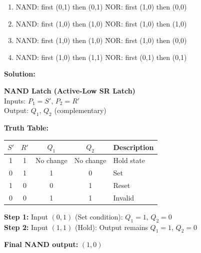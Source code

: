 \documentclass{article}
\begin{document}
\begin{enumerate}[label=(\Alph*)]
    \item \begin{tabbing}
        NAND: first (0,1) then (0,1) \quad \= NOR: first (1,0) then (0,0)
    \end{tabbing}
    
    \item \begin{tabbing}
        NAND: first (1,0) then (1,0) \quad \= NOR: first (1,0) then (1,0)
    \end{tabbing}
    
    \item \begin{tabbing}
        NAND: first (1,0) then (1,0) \quad \= NOR: first (1,0) then (0,0)
    \end{tabbing}
    
    \item \begin{tabbing}
        NAND: first (1,0) then (1,1) \quad \= NOR: first (0,1) then (0,1)
    \end{tabbing}
\end{enumerate}

\vspace{1em}

\noindent\textbf{Solution:}

\textbf{NAND Latch (Active-Low SR Latch)}\\
Inputs: $P_1 = S'$, $P_2 = R'$\\
Output: $Q_1$, $Q_2$ (complementary)

\textbf{Truth Table:}
\begin{center}
\begin{tabular}{|c|c|c|c|l|}
\hline
$S'$ & $R'$ & $Q_1$ & $Q_2$ & Description \\
\hline
1 & 1 & No change & No change & Hold state \\
0 & 1 & 1 & 0 & Set \\
1 & 0 & 0 & 1 & Reset \\
0 & 0 & 1 & 1 & Invalid \\
\hline
\end{tabular}
\end{center}

\textbf{Step 1:} Input $(0, 1)$ (Set condition): $Q_1 = 1$, $Q_2 = 0$\\
\textbf{Step 2:} Input $(1, 1)$ (Hold): Output remains $Q_1 = 1$, $Q_2 = 0$

\vspace{0.5em}
\noindent\textbf{Final NAND output:} $(1, 0)$
\end{document}
